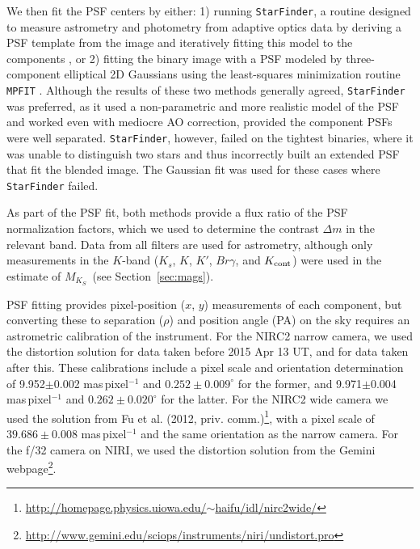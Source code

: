 \documentclass[twocolumn]{aastex62}
\newcommand{\mks}{$M_{K_S}$}
\begin{document}
We then fit the PSF centers by either: 1) running {\tt StarFinder}, a routine designed to measure astrometry and photometry from adaptive optics data by deriving a PSF template from the image and iteratively fitting this model to the components \citep[for more details, see][]{2000A&AS..147..335D}, or 2) fitting the binary image with a PSF modeled by three-component elliptical 2D Gaussians using the least-squares minimization routine {\tt MPFIT} \citep{Markwart2009}. Although the results of these two methods generally agreed, {\tt StarFinder} was preferred, as it used a non-parametric and more realistic model of the PSF and worked even with mediocre AO correction, provided the component PSFs were well separated. {\tt StarFinder}, however, failed on the tightest binaries, where it was unable to distinguish two stars and thus incorrectly built an extended PSF that fit the blended image. The Gaussian fit was used for these cases where {\tt StarFinder} failed. 

As part of the PSF fit, both methods provide a flux ratio of the PSF normalization factors, which we used to determine the contrast $\Delta m$ in the relevant band. Data from all filters are used for astrometry, although only measurements in the $K$-band ($K_s$, $K$, $K'$, $Br\gamma$, and $K_{\rm{cont}}$) were used in the estimate of \mks\ (see Section~\ref{sec:mags}).

PSF fitting provides pixel-position ($x$, $y$) measurements of each component, but converting these to separation ($\rho$) and position angle (PA) on the sky requires an astrometric calibration of the instrument. For the NIRC2 narrow camera, we used the \citet{Yelda2010} distortion solution for data taken before 2015 Apr 13 UT, and \citet{2016PASP..128i5004S} for data taken after this. These calibrations include a pixel scale and orientation determination of 9.952$\pm$0.002 mas\,pixel$^{-1}$ and $0.252\pm0.009^{\circ}$ for the former, and 9.971$\pm$0.004 mas\,pixel$^{-1}$ and $0.262\pm0.020^{\circ}$ for the latter. For the NIRC2 wide camera we used the solution from Fu et al. (2012, priv. comm.)\footnote{\href{http://homepage.physics.uiowa.edu/~haifu/idl/nirc2wide/}{http://homepage.physics.uiowa.edu/$\sim$haifu/idl/nirc2wide/}}, with a pixel scale of $39.686\pm0.008$ mas\,pixel$^{-1}$ and the same orientation as the narrow camera. For the f/32 camera on NIRI, we used the distortion solution from the Gemini webpage\footnote{\href{http://www.gemini.edu/sciops/instruments/niri/undistort.pro}{http://www.gemini.edu/sciops/instruments/niri/undistort.pro}}. 
\end{document}
